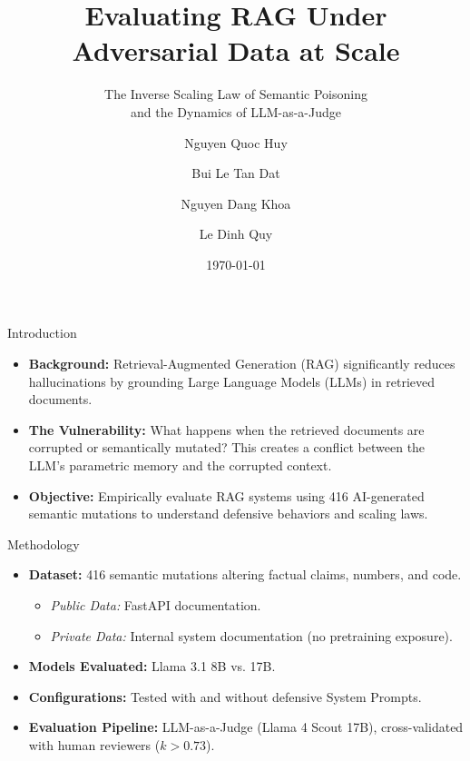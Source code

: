 \documentclass[aspectratio=169]{beamer}
\title[RAG Semantic Poisoning]{Evaluating RAG Under Adversarial Data at Scale}
\subtitle{The Inverse Scaling Law of Semantic Poisoning \\ and the Dynamics of LLM-as-a-Judge}
\author[Nguyen et al.]{Nguyen Quoc Huy \and Bui Le Tan Dat \and Nguyen Dang Khoa \and Le Dinh Quy}
\institute[FPT University]{
  FPT University \\
  \medskip
  \textit{Supervisor: Le Thi Quynh Chi}
}
\date{\today}
\begin{document}
\begin{frame}
  \titlepage
\end{frame}

\begin{frame}{Introduction}
  \begin{itemize}
    \item \textbf{Background:} Retrieval-Augmented Generation (RAG) significantly reduces hallucinations by grounding Large Language Models (LLMs) in retrieved documents.
    \vspace{0.3cm}
    \item \textbf{The Vulnerability:} What happens when the retrieved documents are corrupted or semantically mutated? This creates a conflict between the LLM's parametric memory and the corrupted context.
    \vspace{0.3cm}
    \item \textbf{Objective:} Empirically evaluate RAG systems using 416 AI-generated semantic mutations to understand defensive behaviors and scaling laws.
  \end{itemize}
\end{frame}

\begin{frame}{Methodology}
  \begin{itemize}
    \item \textbf{Dataset:} 416 semantic mutations altering factual claims, numbers, and code.
    \begin{itemize}
      \item \textit{Public Data:} FastAPI documentation.
      \item \textit{Private Data:} Internal system documentation (no pretraining exposure).
    \end{itemize}
    \vspace{0.2cm}
    \item \textbf{Models Evaluated:} Llama 3.1 8B vs. 17B.
    \vspace{0.2cm}
    \item \textbf{Configurations:} Tested with and without defensive System Prompts.
    \vspace{0.2cm}
    \item \textbf{Evaluation Pipeline:} LLM-as-a-Judge (Llama 4 Scout 17B), cross-validated with human reviewers ($k > 0.73$).
  \end{itemize}
\end{frame}
\end{document}
